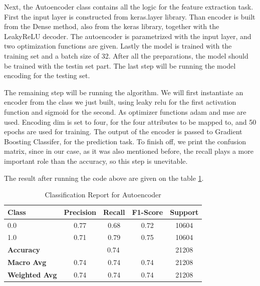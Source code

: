 \noindent Next, the Autoencoder class contains all the logic for the feature extraction task. First the input layer is constructed from keras.layer library. Than encoder is built from the Dense method, also from the keras library, together with the LeakyReLU decoder. The autoencoder is parametrized with the input layer, and two optimization functions are given. Lastly the model is trained with the training set and a batch size of 32. After all the preparations, the model should be trained with the testin set part. The last step will be running the model encoding for the testing set.

\vspace{0.5cm}

\vspace{0.5cm}

\noindent The remaining step will be running the algorithm.
We will first instantiate an encoder from the class we just built, using leaky relu for the first activation function and sigmoid for the second.
As optimizer functions adam and mse are used.
Encoding dim is set to four, for the four attributes to be mapped to, and 50 epochs are used for training.
The output of the encoder is passed to Gradient Boosting Classifer, for the prediction task.
To finish off, we print the confusion matrix, since in our case, as it was also mentioned before, the recall plays a more important role than the accuracy, so this step is unevitable.\\

\vspace{0.5cm}

\vspace{0.5cm}

\noindent The result after running the code above are given on the table \ref{tab:autoencoder_classification_report}.

\begin{table}[h!]
    \centering
    \begin{tabular}{lcccc}
        \hline
        \textbf{Class} & \textbf{Precision} & \textbf{Recall} & \textbf{F1-Score} & \textbf{Support} \\
        \hline
        0.0 & 0.77 & 0.68 & 0.72 & 10604 \\
        1.0 & 0.71 & 0.79 & 0.75 & 10604 \\
        \hline
        \textbf{Accuracy} & \multicolumn{3}{c}{0.74} & 21208 \\
        \textbf{Macro Avg} & 0.74 & 0.74 & 0.74 & 21208 \\
        \textbf{Weighted Avg} & 0.74 & 0.74 & 0.74 & 21208 \\
        \hline
    \end{tabular}
    \caption{Classification Report for Autoencoder}
    \label{tab:autoencoder_classification_report}
\end{table}
